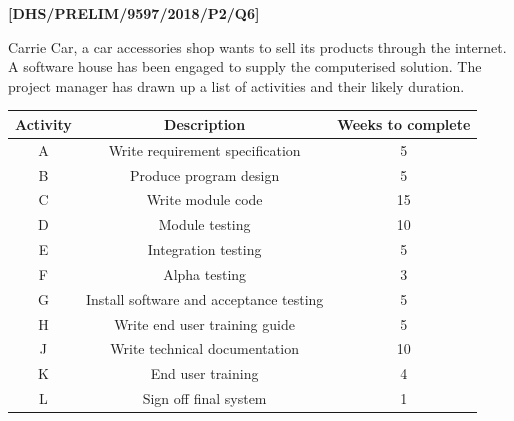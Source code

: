 \item \textbf{{[}DHS/PRELIM/9597/2018/P2/Q6{]} }

Carrie Car, a car accessories shop wants to sell its products through
the internet. A software house has been engaged to supply the computerised
solution. The project manager has drawn up a list of activities and
their likely duration. 
\noindent \begin{center}
\begin{tabular}{|c|c|c|}
\hline 
Activity & Description & Weeks to complete\tabularnewline
\hline 
A & Write requirement specification & 5\tabularnewline
\hline 
B & Produce program design & 5\tabularnewline
\hline 
C & Write module code & 15\tabularnewline
\hline 
D & Module testing & 10\tabularnewline
\hline 
E & Integration testing & 5 \tabularnewline
\hline 
F & Alpha testing & 3\tabularnewline
\hline 
G & Install software and acceptance testing & 5\tabularnewline
\hline 
H & Write end user training guide & 5\tabularnewline
\hline 
J & Write technical documentation & 10\tabularnewline
\hline 
K & End user training & 4\tabularnewline
\hline 
L & Sign off final system & 1\tabularnewline
\hline 
\end{tabular}
\par\end{center}
